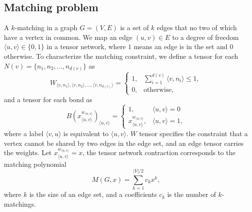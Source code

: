 \documentclass[onefignum, onetabnum]{siamart190516}
\newcommand{\<}{\langle}
\renewcommand{\>}{\rangle}
\begin{document}
\subsection{Matching problem}
A $k$-matching in a graph $G=(V,E)$ is a set of $k$ edges that no two of which have a vertex in common.
We map an edge $(u, v) \in E$ to a degree of freedom $\langle u, v\rangle \in \{0, 1\}$ in a tensor network, where $1$ means an edge is in the set and $0$ otherwise.
To characterize the matching constraint, we define a tensor for each $N(v)=\{n_1, n_2,\ldots, n_{d(v)}\}$ as
\begin{equation}
    W_{\langle v, n_1\rangle, \langle v, n_2 \rangle, \ldots, \langle v, n_{d(v)}\rangle} = \begin{cases}
        1, & \sum_{i=1}^{d(v)} \langle v, n_i \rangle \leq 1,\\
        0, & \text{otherwise},
    \end{cases}
\end{equation}
and a tensor for each bond as
\begin{equation}
    B(x^{w_{\langle u,v \rangle}}_{\langle u,v\rangle})_{\langle u, v\rangle} = \begin{cases}
    1, & \langle u, v \rangle = 0 \\
    x^{w_{\langle u,v \rangle}}_{\langle u, v\rangle}, & \langle u, v \rangle = 1,
\end{cases}
\end{equation}
where a label $\langle v, u \rangle$ is equivalent to $\langle u,v\rangle$.
$W$ tensor specifies the constraint that a vertex cannot be shared by two edges in the edge set,
and an edge tensor carries the weights.
Let $x_{\langle u,v\rangle}^{w_{\langle u,v\rangle}}=x$, the tensor network contraction corresponds to the matching polynomial
\begin{equation}
    M(G, x) = \sum\limits_{k=1}^{|V|/2} c_k x^k,
\end{equation}
where $k$ is the size of an edge set, and a coefficients $c_k$ is the number of $k$-matchings.
\end{document}

